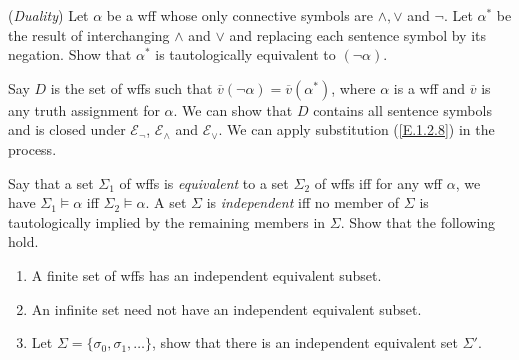 \begin{exercise}
  (\textit{Duality}) Let $\alpha$ be a wff whose only connective symbols are $\wedge,\vee$ and $\neg$. Let $\alpha^*$ be the result of interchanging $\wedge$ and $\vee$ and replacing each sentence symbol by its negation. Show that $\alpha^*$ is tautologically equivalent to $(\neg \alpha)$.
\end{exercise}

Say $D$ is the set of wffs such that $\overline{v}(\neg\alpha)=\overline{v}(\alpha^*)$, where $\alpha$ is a wff and $\overline{v}$ is any truth assignment for $\alpha$. We can show that $D$ contains all sentence symbols and is closed under $\mathcal E_\neg$, $\mathcal{E}_\wedge$ and $\mathcal{E}_\vee$. We can apply substitution (\ref{E.1.2.8}) in the process.

\begin{exercise}
  Say that a set $\Sigma_1$ of wffs is \textit{equivalent} to a set $\Sigma_2$ of wffs iff for any wff $\alpha$, we have $\Sigma_1\vDash \alpha$ iff $\Sigma_2\vDash \alpha$. A set $\Sigma$ is \textit{independent} iff no member of $\Sigma$ is tautologically implied by the remaining members in $\Sigma$. Show that the following hold.\begin{enumerate}[label=(\alph*)]
    \item A finite set of wffs has an independent equivalent subset.
    \item An infinite set need not have an independent equivalent subset.
    \item Let $\Sigma=\{\sigma_0,\sigma_1,\dots\}$, show that there is an independent equivalent set $\Sigma'$.\qedhere
  \end{enumerate}
\end{exercise}

